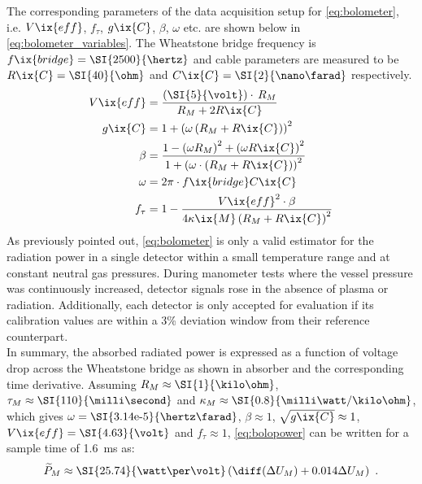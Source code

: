%
                The corresponding parameters of the data acquisition setup for \cref{eq:bolometer}, i.e. $V\ix{eff}$, $f_{\tau}$, $g\ix{C}$, $\beta$, $\omega$ etc. are shown below in \cref{eq:bolometer_variables}. The Wheatstone bridge frequency is $f\ix{bridge}=\text{\SI{2500}{\hertz}}$ and cable parameters are measured to be $R\ix{C}=\text{\SI{40}{\ohm}}$ and $C\ix{C}=\text{\SI{2}{\nano\farad}}$ respectively.%
%
                \begin{align}
                    \begin{split}\label{eq:bolometer_variables}
                        V\ix{eff}&=\frac{\left(\text{\SI{5}{\volt}}\right)\cdot\,R_{M}}{R_{M}+2R\ix{C}}\\%
                        g\ix{C}&=1+\left(\omega\left(R_{M}+R\ix{C}\right)\right)^{2}\\%
                        \beta&=\frac{1-\left(\omega R_{M}\right)^{2}+\left(\omega R\ix{C}\right)^{2}}{1+\left(\omega\cdot\left(R_{M}+R\ix{C}\right)\right)^{2}}\\%
                        \omega&=2\pi\cdot f\ix{bridge}C\ix{C}\\%
                        f_\tau&=1-\frac{V\ix{eff}^{2}\cdot\beta}{4\kappa\ix{M}\left(R_{M}+R\ix{C}\right)^{2}}%
                    \end{split}
                \end{align}
%
                As previously pointed out, \cref{eq:bolometer} is only a valid estimator for the radiation power in a single detector within a small temperature range and at constant neutral gas pressures. During manometer tests where the vessel pressure was continuously increased, detector signals rose in the absence of plasma or radiation. Additionally, each detector is only accepted for evaluation if its calibration values are within a 3\% deviation window from their reference counterpart.\\%
                In summary, the absorbed radiated power is expressed as a function of voltage drop across the Wheatstone bridge as shown in absorber and the corresponding time derivative. Assuming $R_{M}\approx\text{\SI{1}{\kilo\ohm}}$, $\tau_{M}\approx\text{\SI{110}{\milli\second}}$ and $\kappa_{M}\approx\text{\SI{0.8}{\milli\watt/\kilo\ohm}}$, which gives $\omega=\text{\SI{3.14e-5}{\hertz\farad}}$, $\beta\approx1$, $\sqrt{g\ix{C}}\approx1$, $V\ix{eff}=\text{\SI{4.63}{\volt}}$ and $f_{\tau}\approx1$, \cref{eq:bolopower} can be written for a sample time of \SI{1.6}{\milli\second} as:%
%
                \begin{align}%
                    \widetilde{P}_{M}\approx\text{\SI{25.74}{\watt\per\volt}}\left(\diff(\Delta U_{M})+0.014\Delta U_{M}\right)\,\,.\label{eq:approx}%
                \end{align}%
